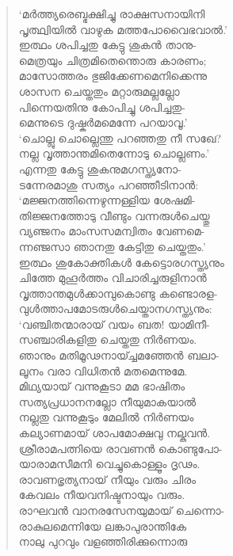\begin{verse}
‘മര്‍ത്ത്യരെബ്ഭക്ഷിച്ചു രാക്ഷസനായിനി\\
പൃത്ഥ്വിയില്‍ വാഴുക മത്തപോവൈഭവാല്‍.’\\
ഇത്ഥം ശപിച്ചതു കേട്ടു ശുകന്‍ താനു-\\
മെത്രയും ചിത്രമിതെന്തൊരു കാരണം;\\
മാസോത്തരം ഭുജിക്കേണമെനിക്കെന്നു\\
ശാസന ചെയ്തതും മറ്റാരുമല്ലല്ലോ\\
പിന്നെയതിനു കോപിച്ചു ശപിച്ചതു-\\
മെന്നുടെ ദുഷ്കര്‍മമെന്നേ പറയാവൂ.’\\
‘ചൊല്ലു ചൊല്ലെന്തു പറഞ്ഞതു നീ സഖേ?\\
നല്ല വൃത്താന്തമിതെന്നോടു ചൊല്ലണം.’\\
എന്നതു കേട്ടു ശുകനുമഗസ്ത്യനോ-\\
ടന്നേരമാശു സത്യം പറഞ്ഞീടിനാന്‍:\\
‘മജ്ജനത്തിന്നെഴുന്നള്ളിയ ശേഷമി-\\
തിജ്ജനത്തോടു വീണ്ടും വന്നരുള്‍ചെയ്തു\\
വ്യഞ്ജനം മാംസസമന്വിതം വേണമെ-\\
ന്നഞ്ജസാ ഞാനതു കേട്ടിതു ചെയ്തതും.’\\
ഇത്ഥം ശുകോക്തികള്‍ കേട്ടൊരഗസ്ത്യനും\\
ചിത്തേ മുഹൂര്‍ത്തം വിചാരിച്ചരുളിനാന്‍\\
വൃത്താന്തമുള്‍ക്കാമ്പുകൊണ്ടു കണ്ടൊരള-\\
വുള്‍ത്താപമോടരുള്‍ചെയ്താനഗസ്ത്യനും:\\
‘വഞ്ചിതന്മാരായ് വയം ബത! യാമിനീ-\\
സഞ്ചാരികളിതു ചെയ്തതു നിര്‍ണയം.\\
ഞാനും മതിമൂഢനായ്ച്ചമഞ്ഞേന്‍ ബലാ-\\
ലൂനം വരാ വിധിതന്‍ മതമെന്നുമേ.\\
മിഥ്യയായ് വന്നുകൂടാ മമ ഭാഷിതം\\
സത്യപ്രധാനനല്ലോ നീയുമാകയാല്‍\\
നല്ലതു വന്നുകൂടും മേലില്‍ നിര്‍ണയം\\
കല്യാണമായ് ശാപമോക്ഷവു നല്കുവന്‍.\\
ശ്രീരാമപത്നിയെ രാവണന്‍ കൊണ്ടുപോ-\\
യാരാമസീമനി വെച്ചുകൊള്ളൂം ദൃഢം.\\
രാവണഭൃത്യനായ് നീയും വരും ചിരം\\
കേവലം നീയവനിഷ്ടനായും വരും.\\
രാഘവന്‍ വാനരസേനയുമായ് ചെന്നൊ-\\
രാകുലമെന്നിയേ ലങ്കാപുരാന്തികേ\\
നാലു പുറവും വളഞ്ഞിരിക്കുന്നൊരു\\

\end{verse}

